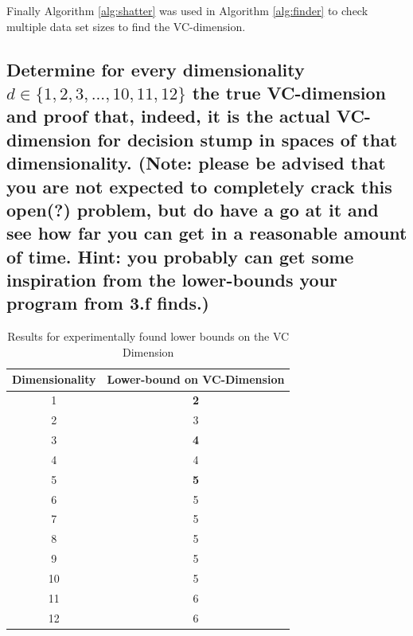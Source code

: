 \documentclass[11pt,a4paper]{article}
\begin{document}
Finally Algorithm \ref{alg:shatter} was used in Algorithm \ref{alg:finder} to check multiple data set sizes to find the VC-dimension.

\subsection{Determine for every dimensionality $d ∈ \{1, 2, 3, . . . , 10, 11, 12\}$ the true VC-dimension and proof that, indeed, it is the actual VC-dimension for decision stump in spaces of that dimensionality. (Note: please be advised that you are not expected to completely crack this open(?) problem, but do have a go at it and see how far you can get in a reasonable amount of time. Hint: you probably can get some inspiration from the lower-bounds your program from 3.f finds.)}
\label{sec:2g}

\begin{table}
    \centering
    \begin{tabular}{|c|c|}
    \hline
    Dimensionality & Lower-bound on VC-Dimension \\ \hline
    1              & \textbf{2}                            \\ \hline
    2              & 3                            \\ \hline
    3              & \textbf{4}                            \\ \hline
    4              & 4                            \\ \hline
    5              & \textbf{5}                            \\ \hline
    6              &    5                         \\ \hline
    7              & 5                           \\ \hline
    8              & 5                            \\ \hline
    9              & 5                            \\ \hline
    10              & 5                            \\ \hline
    11             &  6                          \\ \hline
    12              &  6                           \\ \hline
    \end{tabular}
    \caption{Results for experimentally found lower bounds on the VC Dimension}
    \label{tab:experiment-lower-bound-vc}
\end{table}
\end{document}
